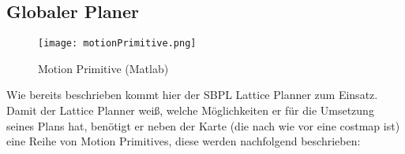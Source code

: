 \documentclass[oribibl]{llncs}
\begin{document}
\subsection{Globaler Planer}
\begin{wrapfigure}[12]{l}{0.5\textwidth}
  \begin{center}
  \vspace{-30pt}
    \texttt{[image: motionPrimitive.png]}
    \caption{Motion Primitive (Matlab)}
	\cite{SBPLRosSchool}
  \end{center}
\end{wrapfigure}
Wie bereits beschrieben kommt hier der SBPL Lattice Planner zum Einsatz.\\
Damit der Lattice Planner weiß, welche Möglichkeiten er für die Umsetzung seines Plans hat, benötigt er neben der Karte (die nach wie vor eine costmap ist) eine Reihe von Motion Primitives, diese werden nachfolgend beschrieben:\\
\end{document}
